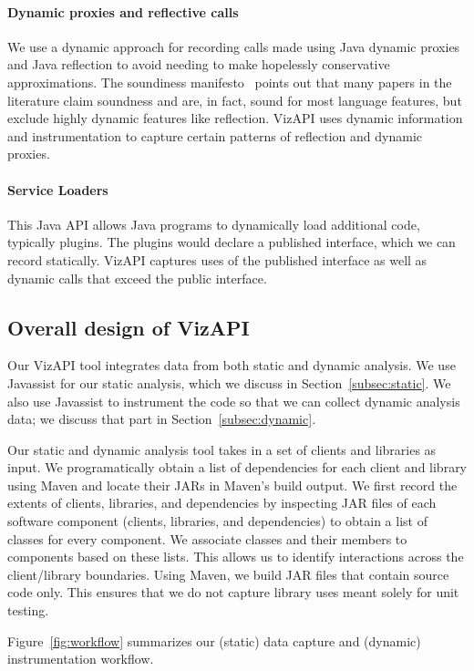 \paragraph{Dynamic proxies and reflective calls} We use a dynamic approach for recording calls made using Java dynamic proxies and Java reflection to avoid needing to make hopelessly conservative approximations. The soundiness manifesto~\cite{livshits15:_in_defen_sound} points out that many papers in the literature claim soundness and are, in fact, sound for most language features, but exclude highly dynamic features like reflection. VizAPI uses dynamic information and instrumentation to capture certain patterns of reflection and dynamic proxies.

\paragraph{Service Loaders} This Java API allows Java programs to dynamically load additional code, typically plugins. The plugins would declare a published interface, which we can record statically. VizAPI captures uses of the published interface as well as dynamic calls that exceed the public interface.


\subsection{Overall design of VizAPI}
Our VizAPI tool integrates data from both static and dynamic analysis.
We use Javassist for our static analysis, which we discuss in Section~\ref{subsec:static}. We also use Javassist to instrument the code so that we can
collect dynamic analysis data; we discuss that part in
Section~\ref{subsec:dynamic}.

Our static and dynamic analysis tool takes in a set of clients and libraries as input.
We programatically obtain a list of dependencies for each client and library using Maven and locate their JARs in Maven's build output.
We first record the extents of clients, libraries, and dependencies by inspecting JAR
files of each software component (clients, libraries, and dependencies) to obtain a
list of classes for every component. We associate classes and their
members to components based on these lists.  This allows us to
identify interactions across the client/library boundaries. Using Maven, we build JAR
files that contain source code only. This ensures that we do not
capture library uses meant solely for unit testing. 

Figure~\ref{fig:workflow} summarizes our
(static) data capture and (dynamic) instrumentation workflow.  \\

